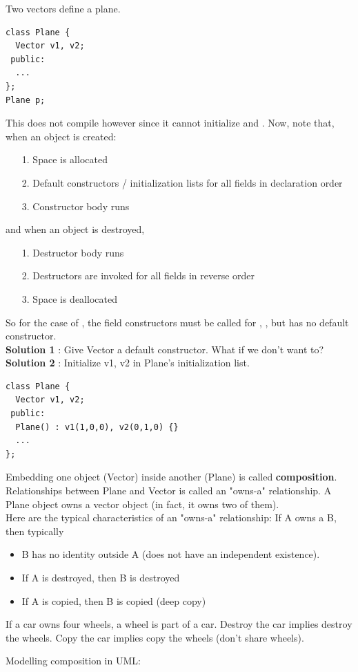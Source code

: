 \documentclass[english, 11pt]{article}
\begin{document}
Two vectors define a plane.

\begin{lstlisting}
class Plane {
  Vector v1, v2;
 public:
  ...
};
Plane p;
\end{lstlisting}

This does not compile however since it cannot initialize  and . Now, note that, when an object is created:
\begin{itemize}
  \item[1.] Space is allocated
  \item[2.] Default constructors / initialization lists for all fields in declaration order
  \item[3.] Constructor body runs
\end{itemize}
and when an object is destroyed,
\begin{itemize}
  \item[1.] Destructor body runs
  \item[2.] Destructors are invoked for all fields in reverse order
  \item[3.] Space is deallocated
\end{itemize}
So for the case of , the field constructors must be called for , , but  has no default constructor. \\

\textbf{Solution 1} : Give Vector a default constructor. What if we don't want to? \\

\textbf{Solution 2} : Initialize v1, v2 in Plane's initialization list.

\begin{lstlisting}
class Plane {
  Vector v1, v2;
 public:
  Plane() : v1(1,0,0), v2(0,1,0) {}
  ...
};
\end{lstlisting}
Embedding one object (Vector) inside another (Plane) is called \textbf{composition}. Relationships between Plane and Vector is called an "owns-a" relationship. A Plane object owns a vector object (in fact, it owns two of them). \\

Here are the typical characteristics of an "owns-a" relationship: If A owns a B, then typically
\begin{itemize}
  \item B has no identity outside A (does not have an independent existence).
  \item If A is destroyed, then B is destroyed
  \item If A is copied, then B is copied (deep copy)
\end{itemize}
\begin{exmp}
  If a car owns four wheels, a wheel is part of a car. Destroy the car implies destroy the wheels. Copy the car implies copy the wheels (don't share wheels).
\end{exmp}
Modelling composition in UML:
\end{document}
